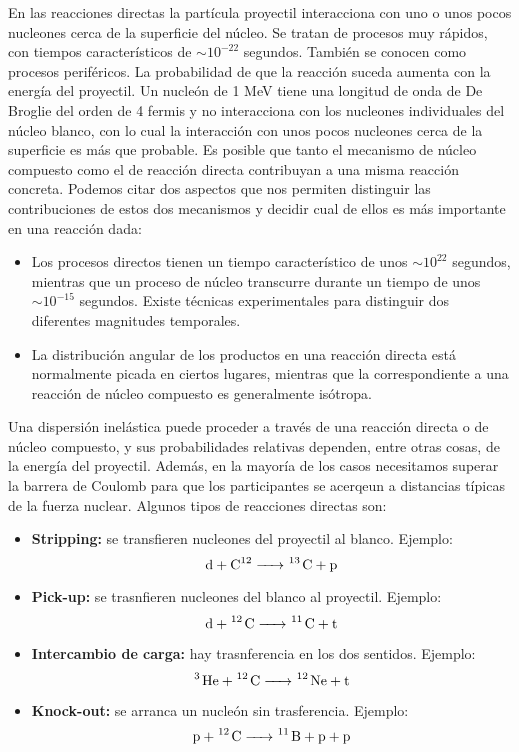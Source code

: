 En las reacciones directas la partícula proyectil interacciona con uno o unos pocos nucleones cerca de la superficie del núcleo. Se tratan de procesos muy rápidos, con tiempos característicos de $\sim 10^{-22}$ segundos. También se conocen como procesos periféricos. La probabilidad de que la reacción suceda aumenta con la energía del proyectil. Un nucleón de 1 MeV tiene una longitud de onda de De Broglie del orden de 4 fermis y no interacciona con los nucleones individuales del núcleo blanco, con lo cual la interacción con unos pocos nucleones cerca de la superficie es más que probable. Es posible que tanto el mecanismo de núcleo compuesto como el de reacción directa contribuyan a una misma reacción concreta. Podemos citar dos aspectos que nos permiten distinguir las contribuciones de estos dos mecanismos y decidir cual de ellos es más importante en una reacción dada:

\begin{itemize}
	\item Los procesos directos tienen un tiempo característico de unos $\sim 10^{22}$ segundos, mientras que un proceso de núcleo transcurre durante un tiempo de unos $\sim 10^{-15}$ segundos. Existe técnicas experimentales para distinguir dos diferentes magnitudes temporales.
	\item La distribución angular de los productos en una reacción directa está normalmente picada en ciertos lugares, mientras que la correspondiente a una reacción de núcleo compuesto es generalmente isótropa.
\end{itemize}
Una dispersión inelástica puede proceder a través de una reacción directa o de núcleo compuesto, y sus probabilidades relativas dependen, entre otras cosas, de la energía del proyectil. Además, en la mayoría de los casos necesitamos superar la barrera de Coulomb para que los participantes se acerqeun a distancias típicas de la fuerza nuclear. Algunos tipos de reacciones directas son:

\begin{itemize}
	\item \textbf{Stripping:} se transfieren nucleones del proyectil al blanco. Ejemplo:
	\begin{equation}
		\ce{d + C^12  -> ^13 C + p}
	\end{equation}
	\item \textbf{Pick-up:} se trasnfieren nucleones del blanco al proyectil. Ejemplo:
	\begin{equation}
		\ce{d +^12 C  -> ^11 C + t}
	\end{equation}
	\item \textbf{Intercambio de carga:} hay trasnferencia en los dos sentidos. Ejemplo:
	\begin{equation}
		\ce{^3 He + ^12 C -> ^12 Ne + t}
	\end{equation}
	\item \textbf{Knock-out:} se arranca un nucleón sin trasferencia. Ejemplo:
	\begin{equation}
		\ce{p + ^12 C -> ^11 B + p + p}
	\end{equation}
\end{itemize}


